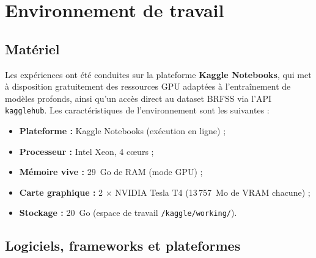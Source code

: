 \documentclass[12pt,a4paper]{report}
\begin{document}
\section{Environnement de travail}

\subsection{Matériel}

Les expériences ont été conduites sur la plateforme \textbf{Kaggle Notebooks}, qui
met à disposition gratuitement des ressources \acs{GPU} adaptées à l'entraînement
de modèles profonds, ainsi qu'un accès direct au dataset \acs{BRFSS} via l'API
\texttt{kagglehub}. Les caractéristiques de l'environnement sont les suivantes :

\begin{itemize}
  \item \textbf{Plateforme :} Kaggle Notebooks (exécution en ligne) ;
  \item \textbf{Processeur :} Intel Xeon, 4 cœurs ;
  \item \textbf{Mémoire vive :} 29~Go de \acs{RAM} (mode \acs{GPU}) ;
  \item \textbf{Carte graphique :} 2 $\times$ NVIDIA Tesla T4 (13\,757~Mo de VRAM
    chacune) ;
  \item \textbf{Stockage :} 20~Go (espace de travail \texttt{/kaggle/working/}).
\end{itemize}

\subsection{Logiciels, frameworks et plateformes}
\end{document}
